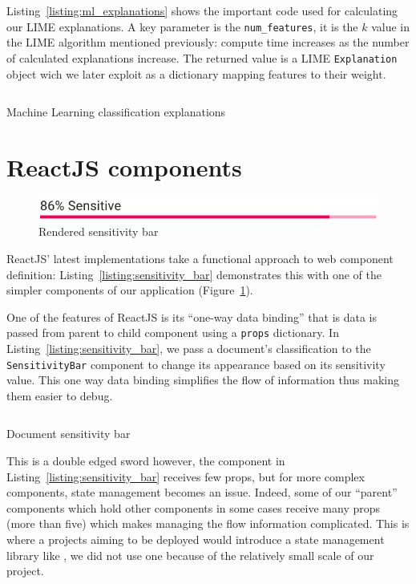 \documentclass[\version]{l4proj}
\begin{document}
Listing~\ref{listing:ml_explanations} shows the important code used for calculating our LIME explanations.
A key parameter is the \verb|num_features|, it is the $k$ value in the LIME algorithm mentioned previously: compute time increases as the number of calculated explanations increase.
The returned value is a LIME \verb|Explanation| object wich we later exploit as a dictionary mapping features to their weight.

\begin{listing}[H]
    \inputminted{python}{code/explanations.py}
    \caption{Machine Learning classification explanations}\label{listing:ml_explanations}
\end{listing}

\section{ReactJS components}

\begin{figure}
    \includegraphics[width=\linewidth]{figures/sensitivity_bar.pdf}
    \caption{Rendered sensitivity bar}\label{fig:sensitivity_bar_preview}
    \vspace{-10pt}
\end{figure}

ReactJS' latest implementations take a functional approach to web component definition: Listing~\ref{listing:sensitivity_bar} demonstrates this with one of the simpler components of our application (Figure~\ref{fig:sensitivity_bar_preview}).

One of the features of ReactJS is its ``one-way data binding'' that is data is passed from parent to child component using a \verb|props| dictionary.
In Listing~\ref{listing:sensitivity_bar}, we pass a document's classification to the \verb|SensitivityBar| component to change its appearance based on its sensitivity value.
This one way data binding simplifies the flow of information thus making them easier to debug.

\begin{listing}[H]
    \inputminted{jsx}{code/documentSensitivityBar.jsx}
    \caption{Document sensitivity bar}\label{listing:sensitivity_bar}
\end{listing}

This is a double edged sword however, the component in Listing~\ref{listing:sensitivity_bar} receives few props, but for more complex components, state management becomes an issue.
Indeed, some of our ``parent'' components which hold other components in some cases receive many props (more than five) which makes managing the flow information complicated.
This is where a projects aiming to be deployed would introduce a state management library like \textcite{Redux2020}, we did not use one because of the relatively small scale of our project.
\end{document}
